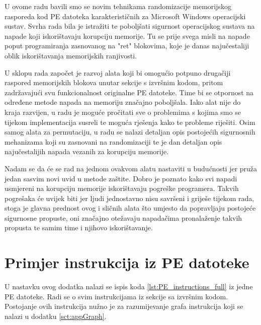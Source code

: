 \documentclass[times, utf8, diplomski, numeric]{fer}
\begin{document}
U ovome radu bavili smo se novim tehnikama randomizacije
memorijskog rasporeda kod PE datoteka karakterističnih za
Microsoft Windows operacijski sustav. Svrha rada bila je
istražiti te poboljšati sigurnost operacijskog sustava na napade
koji iskorištavaju korupciju memorije. Tu se prije svega misli na
napade poput programiranja zasnovanog na "ret" blokovima, koje je
danas najučestaliji oblik iskorištavanja memorijskih ranjivosti.

U sklopu rada započet je razvoj alata koji bi omogućio potpuno
drugačiji raspored memorijskih blokova unutar sekcije s izvršnim
kodom, pritom zadržavajući svu funkcionalnost originalne PE
datoteke. Time bi se otpornost na određene metode napada na
memoriju značajno poboljšala. Iako alat nije do kraja razvijen, u
radu je moguće pročitati sve o problemima s kojima smo se tijekom
implementacija susreli te moguća rješenja kako te probleme
riješiti. Osim samog alata za permutaciju, u radu se nalazi
detaljan opis postojećih sigurnosnih mehanizama koji su zasnovani
na randomizaciji te je dan detaljan opis najučestalijih napada
vezanih za korupciju memorije.

Nadam se da će se rad na jednom ovakvom alatu nastaviti u
budućnosti jer pruža jedan sasvim novi uvid u metode zaštite.
Dobro je poznato kako svi napadi usmjereni na korupciju memorije
iskorištavaju pogreške programera. Takvih pogrešaka će uvijek
biti jer ljudi jednostavno nisu savršeni i griješe tijekom rada,
stoga je glavna prednost ovog i sličnih alata što umjesto da
popravljaju postojeće sigurnosne propuste, oni značajno otežavaju
napadačima pronalaženje takvih propusta te samim time i njihovo
iskorištavanje.


\nocite{*}


\appendix

\chapter{Primjer instrukcija iz PE datoteke}
\label{sct:appPE}

U nastavku ovog dodatka nalazi se ispis koda 
\ref{lst:PE_instructions_full} iz jedne PE datoteke. Radi se o
svim instrukcijama iz sekcije sa izvršnim kodom. Postojanje ovih
instrukcija nužno je za razumijevanje grafa instrukcija koji se
nalazi u dodatku \ref{sct:appGraph}.
\end{document}
